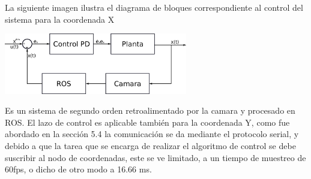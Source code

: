 La siguiente imagen ilustra el diagrama de bloques correspondiente al control del sistema para la coordenada X
\begin{center}
	\includegraphics[width=0.6\textwidth]{Contenido/Cuerpo/Capitulo5/Fig6.eps}
	\label{Fig4}
\end{center}
Es un sistema de segundo orden retroalimentado por la camara y procesado en ROS. El lazo de control es aplicable también para la coordenada Y, como
fue abordado en la sección 5.4 la comunicación se da mediante
el protocolo serial, y debido a que la tarea que se encarga de realizar el algoritmo de control se debe suscribir al nodo de
coordenadas, este se ve limitado, a un tiempo de muestreo de 60fps, o dicho de otro modo a 16.66 ms.

